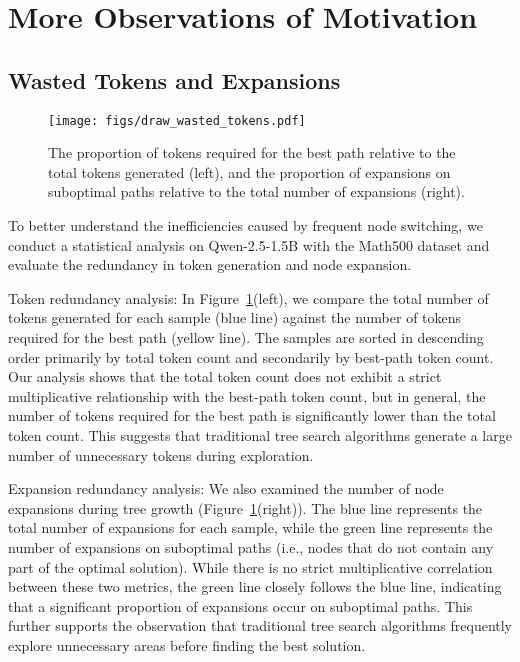 \hspace{0pt}

\section{More Observations of Motivation}
\label{sec:app:motivation}
\subsection{Wasted Tokens and Expansions}
\label{sec:app:wasted}

\begin{figure}[ht]
    \centering
    \texttt{[image: figs/draw\_wasted\_tokens.pdf]}
    \caption{The proportion of tokens required for the best path relative to the total tokens generated (left), and the proportion of expansions on suboptimal paths relative to the total number of expansions (right). }
    \label{fig:motivation_waste_tokens}
\end{figure}

To better understand the inefficiencies caused by frequent node switching, we conduct a statistical analysis on Qwen-2.5-1.5B with the Math500 dataset and evaluate the redundancy in token generation and node expansion. 

Token redundancy analysis: In Figure~\ref{fig:motivation_waste_tokens}(left), we compare the total number of tokens generated for each sample (blue line) against the number of tokens required for the best path (yellow line). The samples are sorted in descending order primarily by total token count and secondarily by best-path token count. Our analysis shows that the total token count does not exhibit a strict multiplicative relationship with the best-path token count, but in general, the number of tokens required for the best path is significantly lower than the total token count.
This suggests that traditional tree search algorithms generate a large number of unnecessary tokens during exploration.

Expansion redundancy analysis: We also examined the number of node expansions during tree growth (Figure~\ref{fig:motivation_waste_tokens}(right)). The blue line represents the total number of expansions for each sample, while the green line represents the number of expansions on suboptimal paths (i.e., nodes that do not contain any part of the optimal solution). While there is no strict multiplicative correlation between these two metrics, the green line closely follows the blue line, indicating that a significant proportion of expansions occur on suboptimal paths. This further supports the observation that traditional tree search algorithms frequently explore unnecessary areas before finding the best solution.



